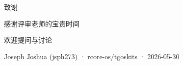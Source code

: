 \documentclass[aspectratio=169,10pt]{ctexbeamer}
\newcommand{\dimtext}[1]{\textcolor{dim}{#1}}
\begin{document}

\begin{frame}[standout]
\vspace{1cm}

{\LARGE 致谢}

\vspace{1cm}

{\large 感谢评审老师的宝贵时间}

\vspace{1cm}

{\normalsize 欢迎提问与讨论}

\vspace{0.5cm}

{\footnotesize\dimtext{Joseph Joshua (jsph273) · rcore-os/tgoskits · 2026-05-30}}

\end{frame}
\end{document}
